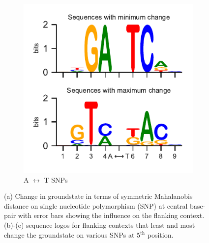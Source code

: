 \begin{figure}[p]
\begin{subfigure}{7cm}
    \centering\includegraphics{images/SNIPS_seq_logo_AT.pdf}
    \centering\caption{A $\longleftrightarrow$ T SNPs}
    \end{subfigure}
\centering\caption{(a) Change in groundstate in terms of symmetric Mahalanobis distance on single nucleotide polymorphism (SNP) at central base-pair with error bars showing the influence on the flanking context.
(b)-(e) sequence logos for flanking contexts that least and most change the groundstate on various SNPs at 5$^\text{th}$ position.
}
\label{c4:fig_SNPs}
\end{figure}

